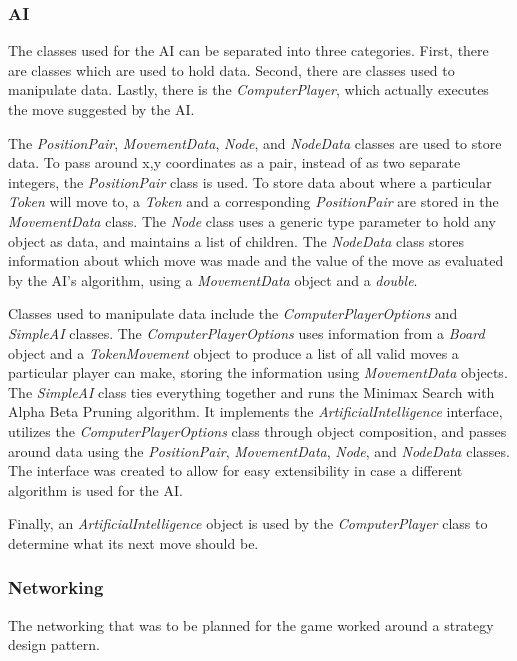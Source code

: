 \documentclass{article}
\begin{document}
\subsubsection{AI}
	The classes used for the AI can be separated into three categories. First, there are classes which are used to hold data. Second, there are classes used to manipulate data. Lastly, there is the \textit{ComputerPlayer}, which actually executes the move suggested by the AI.  \par
	The \textit{PositionPair}, \textit{MovementData}, \textit{Node}, and \textit{NodeData} classes are used to store data. To pass around x,y coordinates as a pair, instead of as two separate integers, the \textit{PositionPair} class is used. To store data about where a particular \textit{Token} will move to, a \textit{Token} and a corresponding \textit{PositionPair} are stored in the \textit{MovementData} class. The \textit{Node} class uses a generic type parameter to hold any object as data, and maintains a list of children. The \textit{NodeData} class stores information about which move was made and the value of the move as evaluated by the AI's algorithm, using a \textit{MovementData} object and a \textit{double}.\par
	Classes used to manipulate data include the \textit{ComputerPlayerOptions} and \textit{SimpleAI} classes. The \textit{ComputerPlayerOptions} uses information from a \textit{Board} object and a \textit{TokenMovement} object to produce a list of all valid moves a particular player can make, storing the information using \textit{MovementData} objects. The \textit{SimpleAI} class ties everything together and runs the Minimax Search with Alpha Beta Pruning algorithm. It implements the \textit{ArtificialIntelligence} interface, utilizes the \textit{ComputerPlayerOptions} class through object composition, and passes around data using the \textit{PositionPair}, \textit{MovementData}, \textit{Node}, and \textit{NodeData} classes. The interface was created to allow for easy extensibility in case a different algorithm is used for the AI.\par
	Finally, an \textit{ArtificialIntelligence} object is used by the \textit{ComputerPlayer} class to determine what its next move should be. 

\subsubsection{Networking}
The networking that was to be planned for the game worked around a strategy design pattern.
\end{document}
